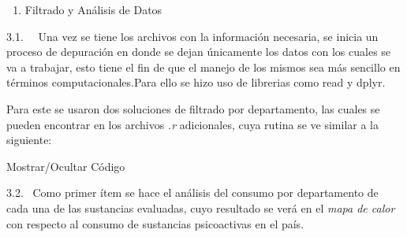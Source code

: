 \documentclass[
]{article}
\newenvironment{Shaded}{\begin{snugshade}}{\end{snugshade}}
\newcommand{\AttributeTok}[1]{\textcolor[rgb]{0.13,0.29,0.53}{#1}}
\newcommand{\CommentTok}[1]{\textcolor[rgb]{0.56,0.35,0.01}{\textit{#1}}}
\newcommand{\ConstantTok}[1]{\textcolor[rgb]{0.56,0.35,0.01}{#1}}
\newcommand{\FunctionTok}[1]{\textcolor[rgb]{0.13,0.29,0.53}{\textbf{#1}}}
\newcommand{\NormalTok}[1]{#1}
\newcommand{\OtherTok}[1]{\textcolor[rgb]{0.56,0.35,0.01}{#1}}
\newcommand{\SpecialCharTok}[1]{\textcolor[rgb]{0.81,0.36,0.00}{\textbf{#1}}}
\newcommand{\StringTok}[1]{\textcolor[rgb]{0.31,0.60,0.02}{#1}}
\providecommand{\tightlist}{%
  \setlength{\itemsep}{0pt}\setlength{\parskip}{0pt}}
\begin{document}
\begin{enumerate}
\def\labelenumi{\arabic{enumi}.}
\setcounter{enumi}{2}
\tightlist
\item
  Filtrado y Análisis de Datos
\end{enumerate}

3.1.~~ Una vez se tiene los archivos con la información necesaria, se
inicia un proceso de depuración en donde se dejan únicamente los datos
con los cuales se va a trabajar, esto tiene el fin de que el manejo de
los mismos sea más sencillo en términos computacionales.Para ello se
hizo uso de librerias como read y dplyr.

Para este se usaron dos soluciones de filtrado por departamento, las
cuales se pueden encontrar en los archivos \emph{.r} adicionales, cuya
rutina se ve similar a la siguiente:

Mostrar/Ocultar Código

\begin{Shaded}
\end{Shaded}

3.2.~ Como primer ítem se hace el análisis del consumo por departamento
de cada una de las sustancias evaluadas, cuyo resultado se verá en el
\emph{mapa de calor} con respecto al consumo de sustancias psicoactivas
en el país.
\end{document}
